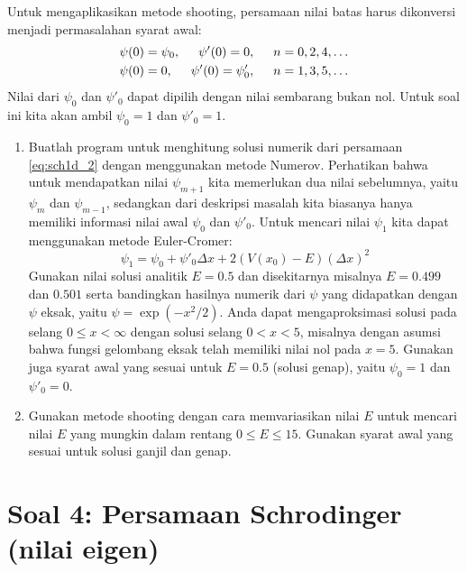 \documentclass[12pt,bahasa]{article}
\begin{document}
Untuk mengaplikasikan metode shooting, persamaan nilai batas harus dikonversi menjadi
permasalahan syarat awal:
\begin{align}
\psi(0) & = \psi_{0},\hspace{0.5cm} \psi'(0) = 0,\hspace{0.5cm} n = 0,2,4,\ldots \\
\psi(0) & = 0,\hspace{0.5cm} \psi'(0) = \psi'_{0},\hspace{0.5cm} n = 1,3,5,\ldots
\end{align}
Nilai dari $\psi_0$ dan $\psi'_0$ dapat dipilih dengan nilai sembarang bukan nol.
Untuk soal ini kita akan ambil $\psi_0 = 1$ dan $\psi'_0 = 1$.

\begin{enumerate}[label=(\alph*)]
\item Buatlah program untuk menghitung solusi numerik dari persamaan \ref{eq:sch1d_2}
dengan menggunakan metode Numerov. Perhatikan bahwa untuk mendapatkan nilai $\psi_{m+1}$ kita memerlukan dua nilai
sebelumnya, yaitu $\psi_{m}$ dan $\psi_{m-1}$, sedangkan dari deskripsi masalah kita
biasanya hanya memiliki informasi nilai awal $\psi_{0}$ dan $\psi'_{0}$.
Untuk mencari nilai $\psi_{1}$ kita dapat menggunakan metode Euler-Cromer:
\begin{equation}
\psi_{1} = \psi_{0} + \psi'_{0}\Delta x + 2(V(x_{0}) - E)(\Delta x)^2
\end{equation}
Gunakan nilai solusi analitik $E = 0.5$ dan disekitarnya misalnya $E = 0.499$ dan $0.501$
serta bandingkan hasilnya numerik dari $\psi$ yang didapatkan dengan
$\psi$ eksak, yaitu $\psi = \exp(-x^2/2)$.
Anda dapat mengaproksimasi solusi pada selang $0 \leq x < \infty$
dengan solusi selang $0 < x < 5$, misalnya dengan asumsi bahwa fungsi gelombang
eksak telah memiliki nilai nol pada $x = 5$.
Gunakan juga syarat awal yang sesuai untuk $E = 0.5$ (solusi genap), yaitu
$\psi_{0} = 1$ dan $\psi'_{0} = 0$.
%
\item Gunakan metode shooting dengan cara memvariasikan nilai $E$ untuk mencari
nilai $E$ yang mungkin dalam rentang $0 \leq E \leq 15$. Gunakan syarat awal
yang sesuai untuk solusi ganjil dan genap.
\end{enumerate}


\section{Soal 4: Persamaan Schrodinger (nilai eigen)}
\end{document}
